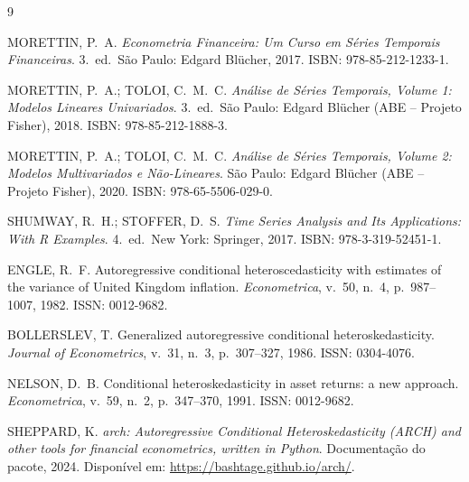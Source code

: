 \documentclass[12pt, a4paper]{article}
\begin{document}
\begin{thebibliography}{9}

MORETTIN, P.~A. \textit{Econometria Financeira: Um Curso em Séries Temporais Financeiras}. 3.\ ed.\ São Paulo: Edgard Blücher, 2017. ISBN: 978-85-212-1233-1.

MORETTIN, P.~A.; TOLOI, C.~M.~C. \textit{Análise de Séries Temporais, Volume 1: Modelos Lineares Univariados}. 3.\ ed.\ São Paulo: Edgard Blücher (ABE -- Projeto Fisher), 2018. ISBN: 978-85-212-1888-3.

MORETTIN, P.~A.; TOLOI, C.~M.~C. \textit{Análise de Séries Temporais, Volume 2: Modelos Multivariados e Não-Lineares}. São Paulo: Edgard Blücher (ABE -- Projeto Fisher), 2020. ISBN: 978-65-5506-029-0.

SHUMWAY, R.~H.; STOFFER, D.~S. \textit{Time Series Analysis and Its Applications: With R Examples}. 4.\ ed.\ New York: Springer, 2017. ISBN: 978-3-319-52451-1.

ENGLE, R.~F. Autoregressive conditional heteroscedasticity with estimates of the variance of United Kingdom inflation. \textit{Econometrica}, v.~50, n.~4, p.~987--1007, 1982. ISSN: 0012-9682.

BOLLERSLEV, T. Generalized autoregressive conditional heteroskedasticity. \textit{Journal of Econometrics}, v.~31, n.~3, p.~307--327, 1986. ISSN: 0304-4076.

NELSON, D.~B. Conditional heteroskedasticity in asset returns: a new approach. \textit{Econometrica}, v.~59, n.~2, p.~347--370, 1991. ISSN: 0012-9682.

SHEPPARD, K. \textit{arch: Autoregressive Conditional Heteroskedasticity (ARCH) and other tools for financial econometrics, written in Python}. Documentação do pacote, 2024. Disponível em: \url{https://bashtage.github.io/arch/}.

\end{thebibliography}
\end{document}
